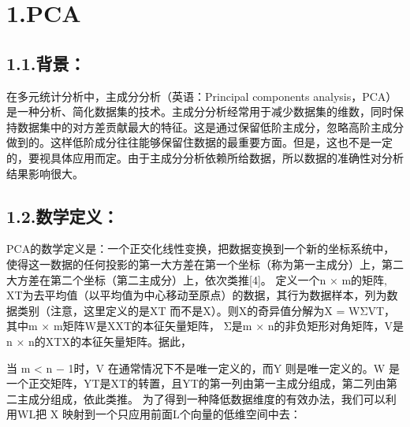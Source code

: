 \documentclass[a4paper, 12pt]{ctexart}
\begin{document}
\mdxtitleblockstart{}
\mdtitleauthorrunning{}{}\mdxtitleblockend%

\mdhr{}%

\section{1.\hspace*{0.5em}PCA}\label{sec-pca}%

\subsection{1.1.\hspace*{0.5em}背景：}\label{section}%

\noindent{}在多元统计分析中，主成分分析（英语：Principal components analysis，PCA）是一种分析、简化数据集的技术。主成分分析经常用于减少数据集的维数，同时保持数据集中的对方差贡献最大的特征。这是通过保留低阶主成分，忽略高阶主成分做到的。这样低阶成分往往能够保留住数据的最重要方面。但是，这也不是一定的，要视具体应用而定。由于主成分分析依赖所给数据，所以数据的准确性对分析结果影响很大。%

\subsection{1.2.\hspace*{0.5em}数学定义：}\label{section}%

\noindent{}PCA的数学定义是：一个正交化线性变换，把数据变换到一个新的坐标系统中，使得这一数据的任何投影的第一大方差在第一个坐标（称为第一主成分）上，第二大方差在第二个坐标（第二主成分）上，依次类推[4]。
定义一个n × m的矩阵, XT为去平均值（以平均值为中心移动至原点）的数据，其行为数据样本，列为数据类别（注意，这里定义的是XT 而不是X）。则X的奇异值分解为X = WΣVT，其中m × m矩阵W是XXT的本征矢量矩阵， Σ是m × n的非负矩形对角矩阵，V是n × n的XTX的本征矢量矩阵。据此，%

当 m \textless{} n − 1时，V 在通常情况下不是唯一定义的，而Y 则是唯一定义的。W 是一个正交矩阵，YT是XT的转置，且YT的第一列由第一主成分组成，第二列由第二主成分组成，依此类推。
为了得到一种降低数据维度的有效办法，我们可以利用WL把 X 映射到一个只应用前面L个向量的低维空间中去：%
\end{document}
